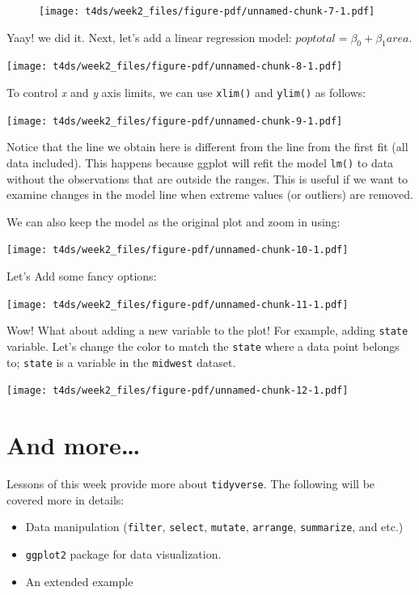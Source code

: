 \documentclass[
  letterpaper,
  DIV=11,
  numbers=noendperiod]{scrreprt}
\providecommand{\tightlist}{%
  \setlength{\itemsep}{0pt}\setlength{\parskip}{0pt}}\usepackage{longtable,booktabs,array}
\begin{document}
\begin{figure}[H]

{\centering \texttt{[image: t4ds/week2\_files/figure-pdf/unnamed-chunk-7-1.pdf]}

}

\end{figure}

Yaay! we did it. Next, let's add a linear regression model:
\(poptotal = \beta_0 + \beta_1 area\).

\texttt{[image: t4ds/week2\_files/figure-pdf/unnamed-chunk-8-1.pdf]}

To control \emph{x} and \emph{y} axis limits, we can use \texttt{xlim()}
and \texttt{ylim()} as follows:

\texttt{[image: t4ds/week2\_files/figure-pdf/unnamed-chunk-9-1.pdf]}

Notice that the line we obtain here is different from the line from the
first fit (all data included). This happens because ggplot will refit
the model \texttt{lm()} to data without the observations that are
outside the ranges. This is useful if we want to examine changes in the
model line when extreme values (or outliers) are removed.

We can also keep the model as the original plot and zoom in using:

\texttt{[image: t4ds/week2\_files/figure-pdf/unnamed-chunk-10-1.pdf]}

Let's Add some fancy options:

\texttt{[image: t4ds/week2\_files/figure-pdf/unnamed-chunk-11-1.pdf]}

Wow! What about adding a new variable to the plot! For example, adding
\texttt{state} variable. Let's change the color to match the
\texttt{state} where a data point belongs to; \texttt{state} is a
variable in the \texttt{midwest} dataset.

\texttt{[image: t4ds/week2\_files/figure-pdf/unnamed-chunk-12-1.pdf]}

\hypertarget{and-more}{%
\section*{And more\ldots{}}\label{and-more}}


Lessons of this week provide more about \texttt{tidyverse}. The
following will be covered more in details:

\begin{itemize}
\tightlist
\item
  Data manipulation (\texttt{filter}, \texttt{select}, \texttt{mutate},
  \texttt{arrange}, \texttt{summarize}, and etc.)
\item
  \texttt{ggplot2} package for data visualization.
\item
  An extended example
\end{itemize}
\end{document}
